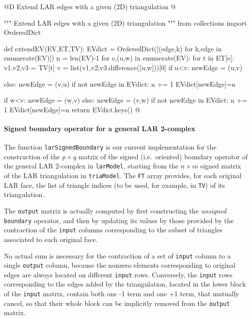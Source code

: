 \documentclass[11pt,oneside]{article}    %
\begin{document}
@D Extend LAR edges with a given (2D) triangulation
@{""" Extend LAR edges with a given (2D) triangulation """
from collections import OrderedDict

def extendEV(EV,ET,TV):
    EVdict = OrderedDict([(edge,k) for k,edge in enumerate(EV)])
    n = len(EV)-1
    for e,(u,w) in enumerate(EV):
        for t in ET[e]:
            v1,v2,v3 = TV[t]
            v = list({v1,v2,v3}.difference([u,w]))[0]
            if u<v: newEdge = (u,v)
            
            else: newEdge = (v,u)
            if not newEdge in EVdict: 
                n += 1
                EVdict[newEdge]=n
                
            if w<v: newEdge = (w,v)
            else: newEdge = (v,w)
            if not newEdge in EVdict: 
                n += 1
                EVdict[newEdge]=n
    return EVdict.keys()
@}


\paragraph{Signed boundary operator for a general LAR 2-complex}

The function \texttt{larSignedBoundary} is our current implementation for the construction of the $p\times q$ matrix of the signed (i.e.~oriented) boundary operator of the general LAR 2-complex in \texttt{larModel}, starting from the $n\times m$ signed matrix of the LAR triangulation in \texttt{triaModel}. The \texttt{FT} array provides, for each original LAR face, the list of triangle indices (to be used, for example, in \texttt{TV}) of its triangulation.

The \texttt{output} matrix is actually computed by  first constructing the \emph{unsigned} \texttt{boundary} operator, and then by updating its values by those provided by the contraction of the \texttt{input} columns corresponding to the subset of triangles associated to each original face.

No actual sum is necessary for the contraction of a set of \texttt{input} column to a single \texttt{output} column, because the nonzero elements corresponding to original edges are always located on different \texttt{input} rows.  Conversely, the \texttt{input} rows corresponding to the edges added by the triangulation, located in the lower block of the \texttt{input} matrix, contain both one -1 term and one +1 term, that mutually cancel, so that their whole block can be implicitly removed from the \texttt{output} matrix.
\end{document}
